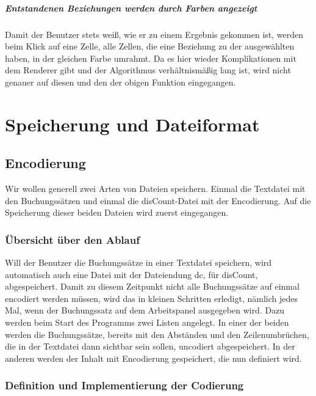 \documentclass[12pt]{report}
\begin{document}
\subsubsection{Entstandenen Beziehungen werden durch Farben angezeigt}
Damit der Benutzer stets weiß, wie er zu einem Ergebnis gekommen ist, werden beim Klick auf eine Zelle, alle Zellen, die eine Beziehung zu der ausgewählten haben, in der gleichen Farbe umrahmt. Da es hier wieder Komplikationen mit dem Renderer gibt und der Algorithmus verhältnismäßig lang ist, wird nicht genauer auf diesen und den der obigen Funktion eingegangen.





\part{Speicherung und Dateiformat}

\chapter{Encodierung}
Wir wollen generell zwei Arten von Dateien speichern. Einmal die Textdatei mit den Buchungssätzen und einmal die disCount-Datei mit der Encodierung. Auf die Speicherung dieser beiden Dateien wird zuerst eingegangen.


\section{Übersicht über den Ablauf}
Will der Benutzer die Buchungssätze in einer Textdatei speichern, wird automatisch auch eine Datei mit der Dateiendung dc, für disCount, abgespeichert. Damit zu diesem Zeitpunkt nicht alle Buchungssätze auf einmal encodiert werden müssen, wird das in kleinen Schritten erledigt, nämlich jedes Mal, wenn der Buchungssatz auf dem Arbeitspanel ausgegeben wird. Dazu werden beim Start des Programms zwei Listen angelegt. In einer der beiden werden die Buchungssätze, bereits mit den Abständen und den Zeilenumbrüchen, die in der Textdatei dann sichtbar sein sollen, uncodiert abgespeichert. In der anderen werden der Inhalt mit Encodierung gespeichert, die nun definiert wird.

\section{Definition und Implementierung der Codierung}
\end{document}
